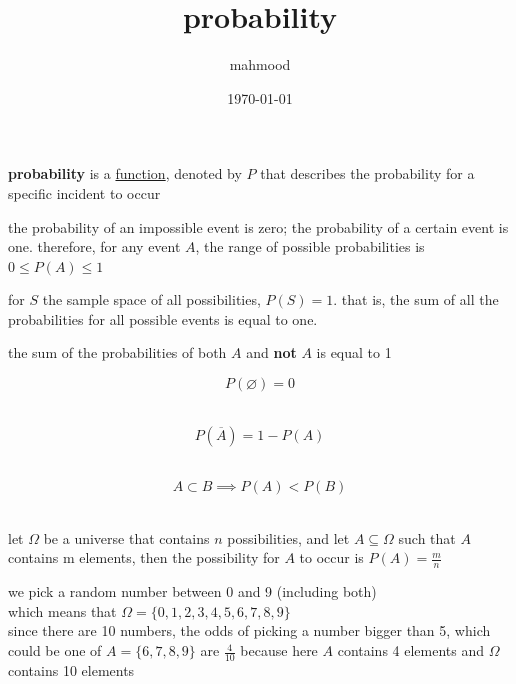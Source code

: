 \documentclass[a4paper,12pt]{article}
\author{mahmood}
\date{\today}
\title{probability}
\begin{document}
\maketitle
\begin{definition}
\textbf{probability} is a \href{discrete_maths2.org}{function}, denoted by \(P\) that describes the probability for a specific incident to occur\\
\begin{lemma}
the probability of an impossible event is zero; the probability of a certain event is one. therefore, for any event \(A\), the range of possible probabilities is \(0 \le P(A) \le 1\)\\
\end{lemma}
\begin{lemma}
for \(S\) the sample space of all possibilities, \(P(S)=1\). that is, the sum of all the probabilities for all possible events is equal to one.\\
\begin{entailment}
the sum of the probabilities of both \(A\) and \textbf{not} \(A\) is equal to 1\\
\end{entailment}
\end{lemma}
\begin{lemma}
\[
P(\varnothing) = 0
\]\\
\end{lemma}
\begin{lemma}
\[
P(\overline{A}) = 1 - P(A)
\]\\
\end{lemma}
\begin{lemma}
\[
A \subset B \implies P(A) < P(B)
\]\\
\end{lemma}
\begin{lemma}
let \(\Omega\) be a universe that contains \(n\) possibilities, and let \(A \subseteq \Omega\) such that \(A\) contains m elements, then the possibility for \(A\) to occur is \(P(A) = \frac{m}{n}\)\\
\begin{my_example}
we pick a random number between 0 and 9 (including both)\\
which means that \(\Omega=\{0,1,2,3,4,5,6,7,8,9\}\)\\
since there are 10 numbers, the odds of picking a number bigger than 5, which could be one of \(A=\{6,7,8,9\}\) are \(\frac{4}{10}\) because here \(A\) contains 4 elements and \(\Omega\) contains 10 elements\\

\end{my_example}
\end{lemma}
\end{definition}
\end{document}
